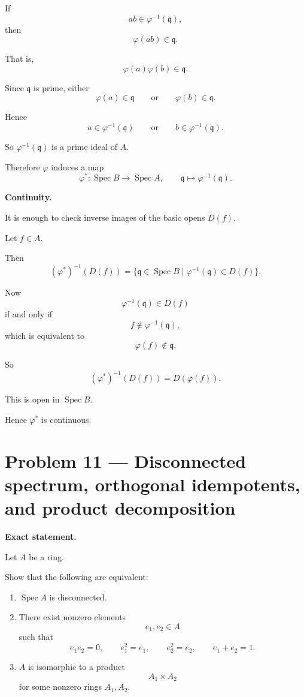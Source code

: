 \documentclass[12pt,a4paper]{article}
\DeclareMathOperator{\Spec}{Spec}
\theoremstyle{plain}
\theoremstyle{definition}      %
\begin{document}
	If
	\[
	ab\in \varphi^{-1}(\mathfrak q),
	\]
	then
	\[
	\varphi(ab)\in \mathfrak q.
	\]
	
	That is,
	\[
	\varphi(a)\varphi(b)\in \mathfrak q.
	\]
	
	Since \(\mathfrak q\) is prime, either
	\[
	\varphi(a)\in \mathfrak q
	\qquad\text{or}\qquad
	\varphi(b)\in \mathfrak q.
	\]
	
	Hence
	\[
	a\in \varphi^{-1}(\mathfrak q)
	\qquad\text{or}\qquad
	b\in \varphi^{-1}(\mathfrak q).
	\]
	
	So \(\varphi^{-1}(\mathfrak q)\) is a prime ideal of \(A\).
	
	Therefore \(\varphi\) induces a map
	\[
	\varphi^*:\Spec B\longrightarrow \Spec A,
	\qquad
	\mathfrak q\longmapsto \varphi^{-1}(\mathfrak q).
	\]
	
	\medskip
	\textbf{Continuity.}
	
	It is enough to check inverse images of the basic opens \(D(f)\).
	
	Let \(f\in A\).
	
	Then
	\[
	(\varphi^*)^{-1}(D(f))
	=
	\{\mathfrak q\in \Spec B \mid \varphi^{-1}(\mathfrak q)\in D(f)\}.
	\]
	
	Now
	\[
	\varphi^{-1}(\mathfrak q)\in D(f)
	\]
	if and only if
	\[
	f\notin \varphi^{-1}(\mathfrak q),
	\]
	which is equivalent to
	\[
	\varphi(f)\notin \mathfrak q.
	\]
	
	So
	\[
	(\varphi^*)^{-1}(D(f))=D(\varphi(f)).
	\]
	
	This is open in \(\Spec B\).
	
	Hence \(\varphi^*\) is continuous.
	
	
	\section*{Problem 11 — Disconnected spectrum, orthogonal idempotents, and product decomposition}
	
	\textbf{Exact statement.}
	
	Let \(A\) be a ring.
	
	Show that the following are equivalent:
	
	\begin{enumerate}
		\item[(i)]
		\(\Spec A\) is disconnected.
		
		\item[(ii)]
		There exist nonzero elements
		\[
		e_1,e_2\in A
		\]
		such that
		\[
		e_1e_2=0,
		\qquad
		e_1^2=e_1,
		\qquad
		e_2^2=e_2,
		\qquad
		e_1+e_2=1.
		\]
		
		\item[(iii)]
		\(A\) is isomorphic to a product
		\[
		A_1\times A_2
		\]
		for some nonzero rings \(A_1,A_2\).
	\end{enumerate}
	
\end{document}
